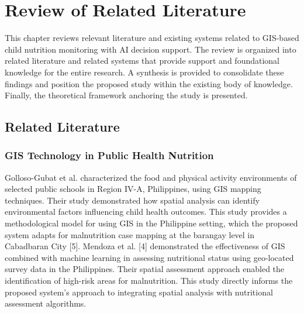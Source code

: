 \documentclass[12pt, a4paper]{report}
\begin{document}
\chapter{Review of Related Literature}
\label{chap:rrl}

This chapter reviews relevant literature and existing systems related to GIS-based child nutrition monitoring with AI decision support. The review is organized into related literature and related systems that provide support and foundational knowledge for the entire research. A synthesis is provided to consolidate these findings and position the proposed study within the existing body of knowledge. Finally, the theoretical framework anchoring the study is presented.

\section{Related Literature}
\label{sec:related_lit}

\subsection{GIS Technology in Public Health Nutrition}
Golloso-Gubat et al. characterized the food and physical activity environments of selected public schools in Region IV-A, Philippines, using GIS mapping techniques. Their study demonstrated how spatial analysis can identify environmental factors influencing child health outcomes. This study provides a methodological model for using GIS in the Philippine setting, which the proposed system adapts for malnutrition case mapping at the barangay level in Cabadbaran City [5].
Mendoza et al. [4] demonstrated the effectiveness of GIS combined with machine learning in assessing nutritional status using geo-located survey data in the Philippines. Their spatial assessment approach enabled the identification of high-risk areas for malnutrition. This study directly informs the proposed system's approach to integrating spatial analysis with nutritional assessment algorithms.
\end{document}
